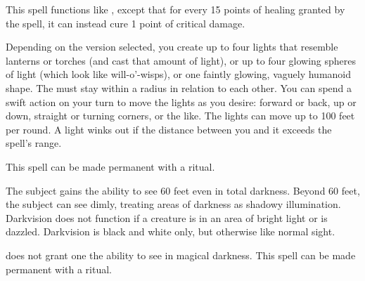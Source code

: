 \begin{spelleffect}
  This spell functions like , except that for every 15 points of healing granted by the spell, it can instead cure 1 point of critical damage.
\end{spelleffect}

\begin{comment}
\subsubsection{D}
\end{comment}

\spellrng{\rngmed}
\begin{spelleffect}
  Depending on the version selected, you create up to four lights that resemble lanterns or torches (and cast that amount of light), or up to four glowing spheres of light (which look like will-o'-wisps), or one faintly glowing, vaguely humanoid shape. The  must stay within a \areasmall radius in relation to each other. You can spend a swift action on your turn to move the lights as you desire: forward or back, up or down, straight or turning corners, or the like. The lights can move up to 100 feet per round. A light winks out if the distance between you and it exceeds the spell's range.
\end{spelleffect}
\begin{spellnotes}
This spell can be made permanent with a  ritual.
\end{spellnotes}

\spellrng{\rngtouch}
\spelldur{\durlong}
\begin{spelleffect}
  The subject gains the ability to see 60 feet even in total darkness. Beyond 60 feet, the subject can see dimly, treating areas of darkness as shadowy illumination. Darkvision does not function if a creature is in an area of bright light or is dazzled. Darkvision is black and white only, but otherwise like normal sight.
\end{spelleffect}
\begin{spellnotes}
   does not grant one the ability to see in magical darkness. This spell can be made permanent with a  ritual.
\end{spellnotes}

